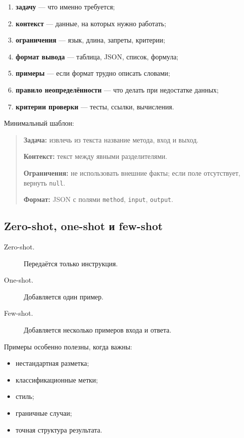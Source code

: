 \documentclass[12pt,a4paper]{article}
\newcommand{\1}{\mathbf{1}}
\theoremstyle{definition}
\theoremstyle{remark}
\begin{document}
\begin{enumerate}
    \item \textbf{задачу} --- что именно требуется;
    \item \textbf{контекст} --- данные, на которых нужно работать;
    \item \textbf{ограничения} --- язык, длина, запреты, критерии;
    \item \textbf{формат вывода} --- таблица, JSON, список, формула;
    \item \textbf{примеры} --- если формат трудно описать словами;
    \item \textbf{правило неопределённости} --- что делать при недостатке
    данных;
    \item \textbf{критерии проверки} --- тесты, ссылки, вычисления.
\end{enumerate}

Минимальный шаблон:

\begin{quote}
\textbf{Задача:} извлечь из текста название метода, вход и выход.

\textbf{Контекст:} текст между явными разделителями.

\textbf{Ограничения:} не использовать внешние факты; если поле отсутствует,
вернуть \texttt{null}.

\textbf{Формат:} JSON с полями
\texttt{method}, \texttt{input}, \texttt{output}.
\end{quote}

\subsection{Zero-shot, one-shot и few-shot}

\begin{description}
    \item[Zero-shot.] Передаётся только инструкция.
    \item[One-shot.] Добавляется один пример.
    \item[Few-shot.] Добавляется несколько примеров входа и ответа.
\end{description}

Примеры особенно полезны, когда важны:

\begin{itemize}
    \item нестандартная разметка;
    \item классификационные метки;
    \item стиль;
    \item граничные случаи;
    \item точная структура результата.
\end{itemize}
\end{document}

